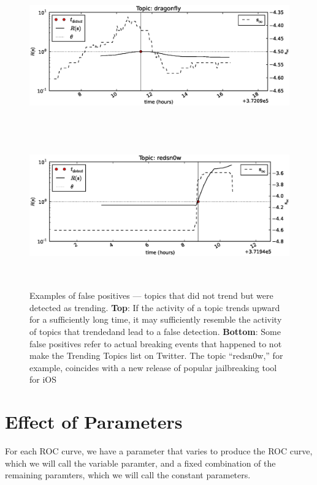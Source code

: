 \begin{figure}[!h]
\begin{center}
\includegraphics[height=2.5in]{../fig/final/detection_examples/fp/dragonfly.eps}
\includegraphics[height=2.5in]{../fig/final/detection_examples/fp/redsn0w.eps}
\end{center}
\caption{\label{fig:examples3} Examples of false positives --- topics that did
  not trend but were detected as trending. {\bf Top}: If the activity of a topic trends
  upward for a sufficiently long time, it may sufficiently resemble the activity
  of topics that trendedand lead to a false detection. {\bf Bottom}: Some false positives
  refer to actual breaking events that happened to not make the Trending Topics
  list on Twitter. The topic ``redsn0w,'' for example, coincides with a new
  release of popular jailbreaking tool for iOS}
\end{figure}

\clearpage
\section{Effect of Parameters}

For each ROC curve, we have a parameter that varies to produce the ROC curve,
which we will call the variable paramter, and a fixed combination of the
remaining paramters, which we will call the constant parameters.

